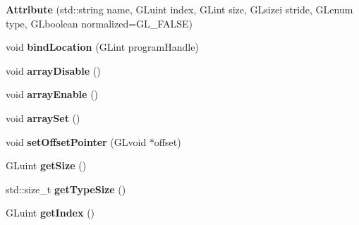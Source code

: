 \begin{DoxyCompactItemize}
\item 
\hypertarget{classfillwave_1_1core_1_1Attribute_a84af142291ef921207254971afda60df}{}{\bfseries Attribute} (std\+::string name, G\+Luint index, G\+Lint size, G\+Lsizei stride, G\+Lenum type, G\+Lboolean normalized=G\+L\+\_\+\+F\+A\+L\+S\+E)\label{classfillwave_1_1core_1_1Attribute_a84af142291ef921207254971afda60df}

\item 
\hypertarget{classfillwave_1_1core_1_1Attribute_acefa30ac4074ebbd8f4fa9587484f4f2}{}void {\bfseries bind\+Location} (G\+Lint program\+Handle)\label{classfillwave_1_1core_1_1Attribute_acefa30ac4074ebbd8f4fa9587484f4f2}

\item 
\hypertarget{classfillwave_1_1core_1_1Attribute_a6bfbb89c7a8a442837ae0aae9675fd92}{}void {\bfseries array\+Disable} ()\label{classfillwave_1_1core_1_1Attribute_a6bfbb89c7a8a442837ae0aae9675fd92}

\item 
\hypertarget{classfillwave_1_1core_1_1Attribute_af6f12e63baa36bd6190a4cf4d232cc64}{}void {\bfseries array\+Enable} ()\label{classfillwave_1_1core_1_1Attribute_af6f12e63baa36bd6190a4cf4d232cc64}

\item 
\hypertarget{classfillwave_1_1core_1_1Attribute_aa9b076ce77136c6a0a12dfece66a8c00}{}void {\bfseries array\+Set} ()\label{classfillwave_1_1core_1_1Attribute_aa9b076ce77136c6a0a12dfece66a8c00}

\item 
\hypertarget{classfillwave_1_1core_1_1Attribute_acbcc48f689446af240c1e0ad38914dc2}{}void {\bfseries set\+Offset\+Pointer} (G\+Lvoid $\ast$offset)\label{classfillwave_1_1core_1_1Attribute_acbcc48f689446af240c1e0ad38914dc2}

\item 
\hypertarget{classfillwave_1_1core_1_1Attribute_af666a7001f8f73168e90fe83f0084e7e}{}G\+Luint {\bfseries get\+Size} ()\label{classfillwave_1_1core_1_1Attribute_af666a7001f8f73168e90fe83f0084e7e}

\item 
\hypertarget{classfillwave_1_1core_1_1Attribute_a5fa591c037c0e9ccfe8b4d84e259865e}{}std\+::size\+\_\+t {\bfseries get\+Type\+Size} ()\label{classfillwave_1_1core_1_1Attribute_a5fa591c037c0e9ccfe8b4d84e259865e}

\item 
\hypertarget{classfillwave_1_1core_1_1Attribute_a5079c77cf36366480cfc0b17d68edc1d}{}G\+Luint {\bfseries get\+Index} ()\label{classfillwave_1_1core_1_1Attribute_a5079c77cf36366480cfc0b17d68edc1d}


\end{DoxyCompactItemize}

